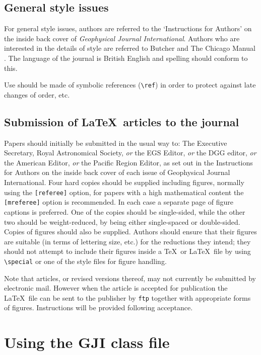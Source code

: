 \subsection{General style issues}

For general style issues, authors are referred to the `Instructions for
Authors' on the inside back cover of \textit{Geophysical Journal
International}. Authors
who are interested in the details of style are referred to Butcher
 and The Chicago Manual . The language of
the journal is British English and spelling should conform to this.

Use should be made of symbolic references (\verb"\ref") in order to
protect against late changes of order, etc.

\subsection{Submission of \LaTeX\ articles to the journal}

Papers should initially be submitted in the usual way to:
The Executive Secretary, Royal Astronomical Society, {\em or\/}
the EGS Editor,  {\em or\/} the DGG editor,  {\em or\/}
the American Editor,  {\em or\/} the Pacific Region Editor,
as set out in the Instructions for Authors on the inside back cover of
each issue of Geophysical Journal International.
Four hard copies should be supplied including figures, normally using the
\verb"[referee]" option, for papers with a  high mathematical content the
\verb"[mreferee]" option is recommended. In each case a separate page of
figure captions is preferred.
One of the copies should  be single-sided,
while the other two should  be weight-reduced, by being either
single-spaced or double-sided.   Copies of figures should
also be supplied. Authors should  ensure that their figures are suitable
(in terms of lettering size, etc.)  for the reductions they intend; they
should not attempt to include their figures inside a \TeX\ or \LaTeX\
file by using \verb"\special" or one of the style files for figure
handling.

Note that articles, or revised versions thereof, may not currently be
submitted by electronic mail. However when the article is accepted for
publication the \LaTeX\ file can be sent to the publisher by \verb"ftp"
together with appropriate forms of figures.  Instructions will be provided
following acceptance.

\section{Using the GJI class file}

